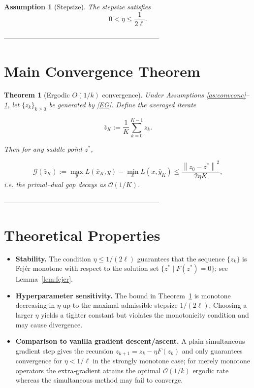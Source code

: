 \documentclass{article}
\newtheorem{theorem}{Theorem}
\newtheorem{assumption}{Assumption}
\newcommand{\norm}[1]{\left\lVert #1\right\rVert}
\newcommand{\gap}{\mathcal{G}}
\begin{document}
\begin{assumption}[Stepsize]\label{as:stepsize}
The stepsize satisfies 
\[
0<\eta\le\frac{1}{2\ell}.
\]
\end{assumption}

--------------------------------------------------------------------
\section*{Main Convergence Theorem}
\begin{theorem}[Ergodic \(O(1/k)\) convergence]\label{thm:rate}
Under Assumptions \ref{as:convconc}–\ref{as:stepsize}, let \(\{z_{k}\}_{k\ge0}\) be generated by \eqref{EG}.  
Define the averaged iterate  

\[
\bar z_{K}:=\frac{1}{K}\sum_{k=0}^{K-1}z_{k}.
\]

Then for any saddle point \(z^{*}\),

\[
\gap(\bar z_{K})
:=\max_{y}L(\bar x_{K},y)-\min_{x}L(x,\bar y_{K})
\le \frac{\norm{z_{0}-z^{*}}^{2}}{2\eta K},
\]
i.e. the primal–dual gap decays as \(\mathcal{O}(1/K)\).
\end{theorem}

--------------------------------------------------------------------
\section*{Theoretical Properties}
\begin{itemize}
\item \textbf{Stability.} The condition \(\eta\le 1/(2\ell)\) guarantees that the
sequence \(\{z_{k}\}\) is Fejér monotone with respect to the solution set
\(\{z^{*}\mid F(z^{*})=0\}\); see Lemma~\ref{lem:fejer}.
\item \textbf{Hyperparameter sensitivity.} The bound in Theorem~\ref{thm:rate}
is monotone decreasing in \(\eta\) up to the maximal admissible stepsize
\(1/(2\ell)\). Choosing a larger \(\eta\) yields a tighter constant but
violates the monotonicity condition and may cause divergence.
\item \textbf{Comparison to vanilla gradient descent/ascent.}
A plain simultaneous gradient step gives the recursion
\(z_{k+1}=z_{k}-\eta F(z_{k})\) and only guarantees convergence for
\(\eta<1/\ell\) in the strongly monotone case; for merely monotone operators
the extra‑gradient attains the optimal \(\mathcal{O}(1/k)\) ergodic rate
whereas the simultaneous method may fail to converge.
\end{itemize}
\end{document}
